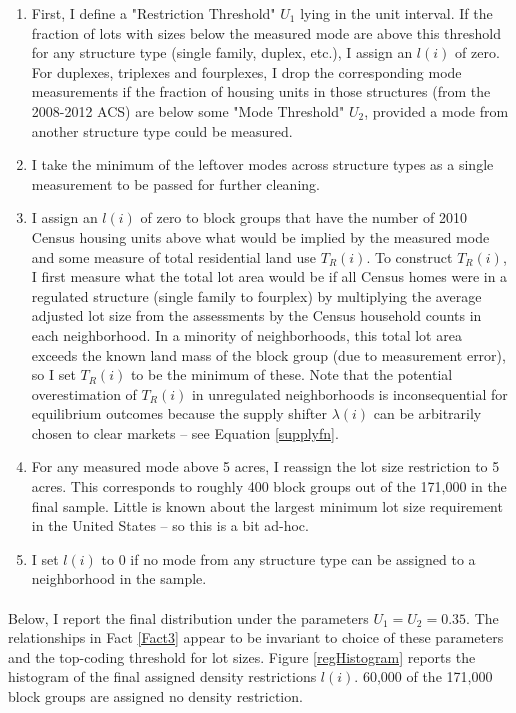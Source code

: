 \documentclass[]{article}
\begin{document}
\begin{enumerate}
	\item First, I define a "Restriction Threshold" $U_{1}$ lying in the unit interval. If the fraction of lots with sizes below the measured mode are above this threshold for any structure type (single family, duplex, etc.), I assign an $l(i)$ of zero. For duplexes, triplexes and fourplexes, I drop the corresponding mode measurements if the fraction of housing units in those structures (from the 2008-2012 ACS) are below some "Mode Threshold" $U_{2}$, provided a mode from another structure type could be measured.
	
	\item I take the minimum of the leftover modes across structure types as a single measurement to be passed for further cleaning. 
	
	\item I assign an $l(i)$ of zero to block groups that have the number of 2010 Census housing units above what would be implied by the measured mode and some measure of total residential land use $T_{R}(i)$. To construct $T_{R}(i)$, I first measure what the total lot area would be if all Census homes were in a regulated structure (single family to fourplex) by multiplying the average adjusted lot size from the assessments by the Census household counts in each neighborhood. In a minority of neighborhoods, this total lot area exceeds the known land mass of the block group (due to measurement error), so I set $T_{R}(i)$ to be the minimum of these. Note that the potential overestimation of $T_{R}(i)$ in unregulated neighborhoods is inconsequential for equilibrium outcomes because the supply shifter $\lambda(i)$ can be arbitrarily chosen to clear markets -- see Equation \ref{supplyfn}. 
	
	\item For any measured mode above 5 acres, I reassign the lot size restriction to 5 acres. This corresponds to roughly 400 block groups out of the 171,000 in the final sample. Little is known about the largest minimum lot size requirement in the United States -- so this is a bit ad-hoc. 
	
	\item I set $l(i)$ to $0$ if no mode from any structure type can be assigned to a neighborhood in the sample. 
\end{enumerate}

\paragraph*{}	
Below, I report the final distribution under the parameters $U_{1} = U_{2} = 0.35$. The relationships in Fact \ref{Fact3} appear to be  invariant to choice of these parameters and the top-coding threshold for lot sizes. Figure \ref{regHistogram} reports the histogram of the final assigned density restrictions $l(i)$. 60,000 of the 171,000 block groups are assigned no density restriction. 
\end{document}
